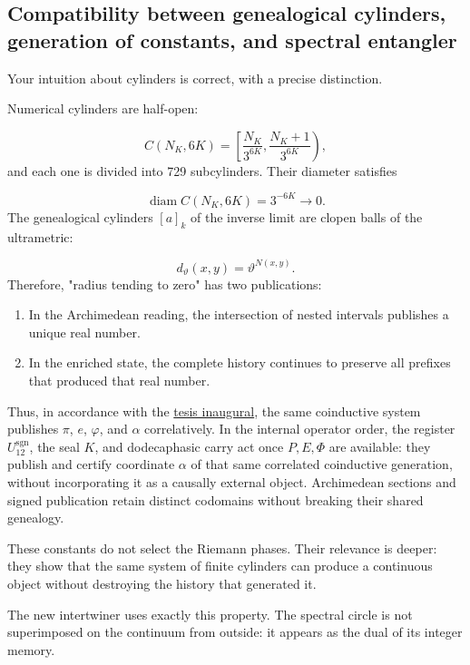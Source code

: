 \subsection{Compatibility between genealogical cylinders, generation of constants, and spectral entangler}
Your intuition about cylinders is correct, with a precise distinction.\par
Numerical cylinders are half-open:\par
\[
C(N_K,6K)
=
\left[
\frac{N_K}{3^{6K}},
\frac{N_K+1}{3^{6K}}
\right),
\]
and each one is divided into 729 subcylinders. Their diameter satisfies\par
\[
\operatorname{diam}C(N_K,6K)=3^{-6K}\longrightarrow0.
\]
The genealogical cylinders \([a]_k\) of the inverse limit are clopen balls of the ultrametric:\par
\[
d_\vartheta(x,y)
=
\vartheta^{N(x,y)}.
\]
Therefore, "radius tending to zero" has two publications:\par
\begin{enumerate}
\item In the Archimedean reading, the intersection of nested intervals publishes a unique real number.
\item In the enriched state, the complete history continues to preserve all prefixes that produced that real number.
\end{enumerate}
Thus, in accordance with the \hyperref[sec:tesis-inaugural-helicoidal-hmt-md]{tesis inaugural}, the same coinductive system publishes \(\pi\), \(e\), \(\varphi\), and \(\alpha\) correlatively. In the internal operator order, the register \(U_{12}^{\mathrm{sgn}}\), the seal \(K\), and dodecaphasic carry act once \(P,E,\Phi\) are available: they publish and certify coordinate \(\alpha\) of that same correlated coinductive generation, without incorporating it as a causally external object. Archimedean sections and signed publication retain distinct codomains without breaking their shared genealogy.\par
These constants do not select the Riemann phases. Their relevance is deeper: they show that the same system of finite cylinders can produce a continuous object without destroying the history that generated it.\par
The new intertwiner uses exactly this property. The spectral circle is not superimposed on the continuum from outside: it appears as the dual of its integer memory.\par
{}
